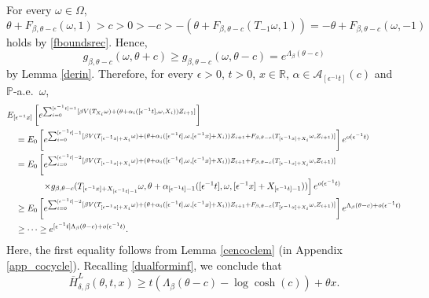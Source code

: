 \documentclass[a4paper]{amsart}
\numberwithin{equation}{section}
\theoremstyle{plain}
\theoremstyle{remark}
\begin{document}
For every $\omega\in\Omega$,
$$\theta + F_{\beta,\theta-c}(\omega,1) > c > 0 > -c > - (\theta + F_{\beta,\theta-c}(T_{-1}\omega,1)) = -\theta + F_{\beta,\theta-c}(\omega,-1)$$
holds by \eqref{fboundsrec}. Hence,
\begin{equation}\label{budaynim}
g_{\beta,\theta-c}(\omega,\theta+c) \ge g_{\beta,\theta-c}(\omega,\theta-c) = e^{\Lambda_\beta(\theta-c)}
\end{equation}
by Lemma \ref{derin}. Therefore, for every ${\epsilon}>0$, $t>0$, $x\in\mathbb{R}$, $\alpha\in\mathcal{A}_{[{\epsilon^{-1}} t]}(c)$ and $\mathbb{P}$-a.e.\ $\omega$,
\begin{align}
& E_{[{\epsilon^{-1}} x]}\left[e^{\sum_{i=0}^{[{\epsilon^{-1}} t]-1} [\beta V(T_{X_i}\omega) + (\theta + \alpha_i([{\epsilon^{-1}} t],\omega,X_i))Z_{i+1}]}\right]\nonumber\\
&\quad = E_0\left[e^{\sum_{i=0}^{[{\epsilon^{-1}} t]-1} [\beta V(T_{[{\epsilon^{-1}} x] + X_i}\omega) + (\theta + \alpha_i([{\epsilon^{-1}} t],\omega,[{\epsilon^{-1}} x] + X_i))Z_{i+1} + F_{\beta,\theta-c}(T_{[{\epsilon^{-1}} x] + X_i}\omega,Z_{i+1})]}\right]e^{o({\epsilon^{-1}} t)}\nonumber\\
&\quad = E_0\left[e^{\sum_{i=0}^{[{\epsilon^{-1}} t]-2} [\beta V(T_{[{\epsilon^{-1}} x] + X_i}\omega) + (\theta + \alpha_i([{\epsilon^{-1}} t],\omega,[{\epsilon^{-1}} x] + X_i))Z_{i+1} + F_{\beta,\theta-c}(T_{[{\epsilon^{-1}} x] + X_i}\omega,Z_{i+1})]}\right.\nonumber\\
&\hspace{14mm}\left.\times g_{\beta,\theta-c}(T_{[{\epsilon^{-1}} x] + X_{[{\epsilon^{-1}} t]-1}}\omega,\theta + \alpha_{[{\epsilon^{-1}} t]-1}([{\epsilon^{-1}} t],\omega,[{\epsilon^{-1}} x] + X_{[{\epsilon^{-1}} t]-1}))\right]e^{o({\epsilon^{-1}} t)}\nonumber\\
&\quad \ge E_0\left[e^{\sum_{i=0}^{[{\epsilon^{-1}} t]-2} [\beta V(T_{[{\epsilon^{-1}} x] + X_i}\omega) + (\theta + \alpha_i([{\epsilon^{-1}} t],\omega,[{\epsilon^{-1}} x] + X_i))Z_{i+1} + F_{\beta,\theta-c}(T_{[{\epsilon^{-1}} x] + X_i}\omega,Z_{i+1})]}\right]e^{\Lambda_\beta(\theta - c) + o({\epsilon^{-1}} t)}\nonumber\\
&\quad \ge \cdots \ge e^{[{\epsilon^{-1}} t]\Lambda_\beta(\theta - c) + o({\epsilon^{-1}} t)}.\nonumber
\end{align}
Here, the first equality follows from Lemma \ref{cencoclem} (in Appendix \ref{app_cocycle}). Recalling \eqref{dualforminf}, we conclude that
\begin{equation}\label{LBpart2}
\overline H_{\delta,\beta}^L(\theta,t,x) \ge t(\Lambda_\beta(\theta - c) - \log\cosh(c)) + \theta x.
\end{equation}
\end{document}
